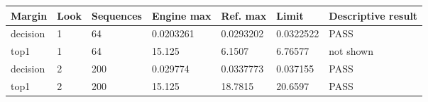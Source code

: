 \begin{tabular}{lllllll}
\toprule
Margin & Look & Sequences & Engine max & Ref. max & Limit & Descriptive result \\
\midrule
decision & 1 & 64 & 0.0203261 & 0.0293202 & 0.0322522 & PASS \\
top1 & 1 & 64 & 15.125 & 6.1507 & 6.76577 & not shown \\
decision & 2 & 200 & 0.029774 & 0.0337773 & 0.037155 & PASS \\
top1 & 2 & 200 & 15.125 & 18.7815 & 20.6597 & PASS \\
\bottomrule
\end{tabular}

